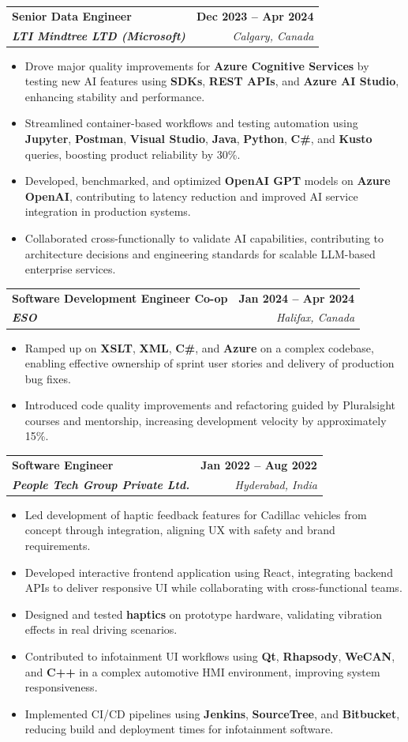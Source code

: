 \documentclass[letterpaper,11pt]{article}
\makeatletter
\newcommand{\resumeItem}[1]{
  \item\small{
    {#1 \vspace{-2pt}}
  }
}
\newcommand{\resumeSubheading}[4]{
  \vspace{-2pt}\item
    \begin{tabular*}{1.0\textwidth}[t]{l@{\extracolsep{\fill}}r}
      \textbf{#1} & \textbf{\small #2} \\
      \textit{\small#3} & \textit{\small #4} \\
    \end{tabular*}\vspace{-7pt}
}
\newcommand{\resumeItemListStart}{\begin{itemize}}
\newcommand{\resumeItemListEnd}{\end{itemize}\vspace{-5pt}}
\makeatother
\begin{document}
    \resumeSubheading
      {\textbf{Senior Data Engineer}}{\textbf{Dec 2023 -- Apr 2024}}
      {\textbf{LTI Mindtree LTD (Microsoft)}}{Calgary, Canada}
      \resumeItemListStart
        \resumeItem{Drove major quality improvements for \textbf{Azure Cognitive Services} by testing new AI features using \textbf{SDKs}, \textbf{REST APIs}, and \textbf{Azure AI Studio}, enhancing stability and performance.}
        \resumeItem{Streamlined container-based workflows and testing automation using \textbf{Jupyter}, \textbf{Postman}, \textbf{Visual Studio}, \textbf{Java}, \textbf{Python}, \textbf{C\#}, and \textbf{Kusto} queries, boosting product reliability by 30\%.}
        \resumeItem{Developed, benchmarked, and optimized \textbf{OpenAI GPT} models on \textbf{Azure OpenAI}, contributing to latency reduction and improved AI service integration in production systems.}
        \resumeItem{Collaborated cross-functionally to validate AI capabilities, contributing to architecture decisions and engineering standards for scalable LLM-based enterprise services.}
      \resumeItemListEnd
    
    \resumeSubheading
      {\textbf{Software Development Engineer Co-op}}{\textbf{Jan 2024 -- Apr 2024}}
      {\textbf{ESO}}{Halifax, Canada}
      \resumeItemListStart
        \resumeItem{Ramped up on \textbf{XSLT}, \textbf{XML}, \textbf{C\#}, and \textbf{Azure} on a complex codebase, enabling effective ownership of sprint user stories and delivery of production bug fixes.}
        \resumeItem{Introduced code quality improvements and refactoring guided by Pluralsight courses and mentorship, increasing development velocity by approximately 15\%.}
      \resumeItemListEnd

    \resumeSubheading
      {\textbf{Software Engineer}}{\textbf{Jan 2022 -- Aug 2022}}
      {\textbf{People Tech Group Private Ltd.}}{Hyderabad, India}
      \resumeItemListStart
        \resumeItem{Led development of haptic feedback features for Cadillac vehicles from concept through integration, aligning UX with safety and brand requirements.}
        \resumeItem{Developed interactive frontend application using React, integrating backend APIs to deliver responsive UI while collaborating with cross-functional teams.}
        \resumeItem{Designed and tested \textbf{haptics} on prototype hardware, validating vibration effects in real driving scenarios.}
        \resumeItem{Contributed to infotainment UI workflows using \textbf{Qt}, \textbf{Rhapsody}, \textbf{WeCAN}, and \textbf{C++} in a complex automotive HMI environment, improving system responsiveness.}
        \resumeItem{Implemented CI/CD pipelines using \textbf{Jenkins}, \textbf{SourceTree}, and \textbf{Bitbucket}, reducing build and deployment times for infotainment software.}
      \resumeItemListEnd
\end{document}
